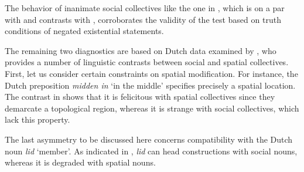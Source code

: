 \documentclass[output=paper]{langscibook}
\begin{document}
\noindent The behavior of inanimate social collectives like the one in , which is on a par with  and contrasts with , corroborates the validity of the test based on truth conditions of negated existential statements.

	\ea\judgewidth{$\nvDash$}\label{wan:ex:entailment-fleet}
	\label{wan:ex:entailment-fleet1}
	\label{wan:ex:entailment-fleet2}
    \z
    \z

\noindent The remaining two diagnostics are based on Dutch data examined by \citet{zwarts2020contiguity}, who provides a number of linguistic contrasts between social and spatial collectives. First, let us consider certain constraints on spatial modification. For instance, the Dutch preposition \textit{midden in} `in the middle' specifies precisely a spatial location. The contrast in  shows that it is felicitous with spatial collectives since they demarcate a topological region, whereas it is strange with social collectives, which lack this property.	
	
	\ea\label{wan:ex:spatial} 
    \z	
    \z

\noindent The last asymmetry to be discussed here concerns compatibility with the Dutch noun \textit{lid} `member'. As indicated in , \textit{lid} can head constructions with social nouns, whereas it is degraded with spatial nouns.
	
	\ea\label{wan:ex:member} 
    \z	
    \z
\end{document}
